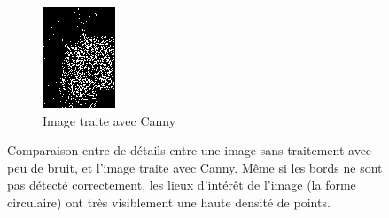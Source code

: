 \documentclass[a4paper, 12pt, titlepage, oneside, french]{article}
\begin{document}
\begin{figure}[]
		\begin{subfigure}[b]{0.4\linewidth}
			\includegraphics[width=\linewidth]{CANNY_ExempleDetailsB.png}
			\caption{Image traite avec Canny}
		\end{subfigure}
		\caption{Comparaison entre de détails entre une image sans traitement avec peu de bruit, et l'image traite avec Canny. Même si les bords ne sont pas détecté correctement, les lieux d'intérêt de l'image (la forme circulaire) ont très visiblement une haute densité de points.}
		\label{fig:CannyDetails}
	\end{figure}
\end{document}
